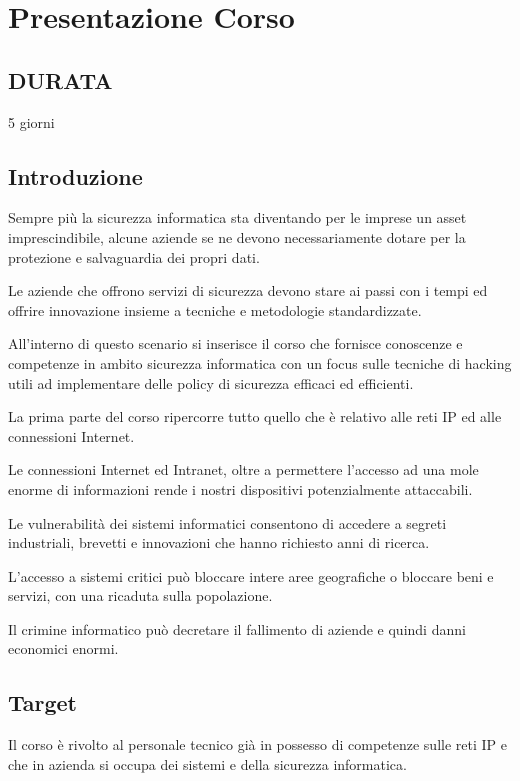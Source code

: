 \chapter{Presentazione Corso} %


\section{DURATA}
 5 giorni
\section{Introduzione}

Sempre più la sicurezza informatica sta diventando per le imprese un asset imprescindibile, alcune aziende se ne devono necessariamente
dotare per la protezione e salvaguardia dei propri dati.

Le aziende che offrono servizi di sicurezza devono stare ai passi con i tempi ed offrire innovazione insieme a tecniche e metodologie standardizzate.

All’interno di questo scenario si inserisce il corso che fornisce conoscenze e competenze  in ambito sicurezza informatica con un focus sulle tecniche di hacking utili ad implementare delle policy
di sicurezza efficaci ed efficienti.

La prima parte del corso ripercorre tutto quello che è relativo alle reti IP ed alle connessioni Internet.

Le connessioni Internet ed Intranet, oltre a permettere l'accesso ad una mole enorme di informazioni
rende i nostri dispositivi potenzialmente attaccabili.

Le vulnerabilità dei sistemi informatici consentono di accedere a segreti industriali, brevetti e
innovazioni che hanno richiesto anni di ricerca.

L'accesso a sistemi critici può bloccare intere aree geografiche o bloccare beni e servizi, con una ricaduta sulla popolazione. 

Il crimine informatico può decretare il fallimento di aziende e quindi danni economici enormi.

\section{Target}
Il corso è rivolto al personale tecnico già in possesso di competenze sulle reti IP e che in azienda si
occupa dei sistemi e della sicurezza informatica.

